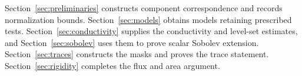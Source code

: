 Section~\ref{sec:preliminaries} constructs component correspondence and
records normalization bounds.  Section~\ref{sec:models} obtains models
retaining prescribed tests.  Section~\ref{sec:conductivity} supplies
the conductivity and level-set estimates, and
Section~\ref{sec:sobolev} uses them to prove scalar Sobolev extension.
Section~\ref{sec:traces} constructs the masks and proves the trace
statement.  Section~\ref{sec:rigidity} completes the flux and area
argument.
